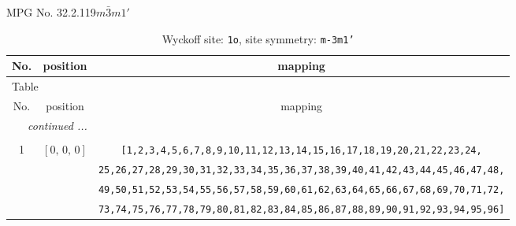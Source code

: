\documentclass[fleqn,8pt]{jsarticle}
\begin{document}
\setcounter{MaxMatrixCols}{32}

\renewcommand{\tablename}{Table~}
\renewcommand{\figurename}{Figure~}
\begin{center}
\LARGE
MPG No. 32.2.119\quad$m\bar{3}m1'$
\end{center}
\renewcommand{\arraystretch}{1.2}
\begin{longtable}{ccc}
\caption{Wyckoff site: {\tt 1o}, site symmetry: {\tt m-3m1'}}
 \\
 \hline \hline
No. & position & mapping \\ \hline \endfirsthead

\multicolumn{2}{l}{\tablename\ \thetable{}} \\
 \hline \hline
No. & position & mapping \\ \hline \endhead

 \hline \hline
\multicolumn{2}{r}{\footnotesize\it continued ...} \\ \endfoot

 \hline \hline
\multicolumn{2}{r}{} \\ \endlastfoot

1 & $\left[ 0,\, 0,\, 0 \right]$ & {\tt [1,2,3,4,5,6,7,8,9,10,11,12,13,14,15,16,17,18,19,20,21,22,23,24,} \\ \hline
 &  & {\tt 25,26,27,28,29,30,31,32,33,34,35,36,37,38,39,40,41,42,43,44,45,46,47,48,} \\ \hline
 &  & {\tt 49,50,51,52,53,54,55,56,57,58,59,60,61,62,63,64,65,66,67,68,69,70,71,72,} \\ \hline
 &  & {\tt 73,74,75,76,77,78,79,80,81,82,83,84,85,86,87,88,89,90,91,92,93,94,95,96]} \\
\end{longtable}
\renewcommand{\arraystretch}{1.2}
\end{document}

